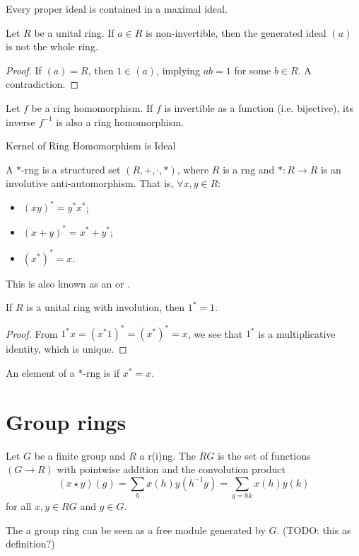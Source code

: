 \begin{proposition} \label{prop:everyProperIdealInMaximalIdeal}
Every proper ideal is contained in a maximal ideal.
\end{proposition}

\begin{lemma} \label{lemma:nonInvertibleGeneratedIdeals}
Let $R$ be a unital ring. If $a\in R$ is non-invertible, then the generated ideal $(a)$ is not the whole ring.
\end{lemma}
\begin{proof}
If $(a) = R$, then $1\in (a)$, implying $ab=1$ for some $b\in R$. A contradiction.
\end{proof}

\begin{proposition}
Let $f$ be a ring homomorphism. If $f$ is invertible as a function (i.e. bijective), its inverse $f^{-1}$ is also a ring homomorphism.
\end{proposition}

\begin{proposition} \label{prop:kernelIsIdeal}
Kernel of Ring Homomorphism is Ideal
\end{proposition}

\begin{definition}
A $*$-rng is a structured set $(R,+,\cdot, *)$, where $R$ is a rng and $*:R\to R$ is an involutive anti-automorphism. That is, $\forall x,y\in R$:
\begin{itemize}
\item $(xy)^* = y^*x^*$;
\item $(x+y)^* = x^* + y^*$;
\item $(x^*)^* = x$.
\end{itemize}
This is also known as an  or .
\end{definition}
\begin{lemma}
If $R$ is a unital ring with involution, then $1^* = 1$.
\end{lemma}
\begin{proof}
From $1^*x = (x^*1)^* = (x^*)^* = x$, we see that $1^*$ is a multiplicative identity, which is unique.
\end{proof}
\begin{definition}
An element of a $*$-rng is  if $x^* = x$.
\end{definition}

\section{Group rings}
\begin{definition}
Let $G$ be a finite group and $R$ a r(i)ng. The  $RG$ is the set of functions $(G\to R)$ with pointwise addition and the convolution product
\[ (x\star y)(g) = \sum_h x(h)y(h^{-1}g) = \sum_{g=hk}x(h)y(k) \]
for all $x,y\in RG$ and $g\in G$. 
\end{definition}
The a group ring can be seen as a free module generated by $G$. (TODO: this as definition?)



